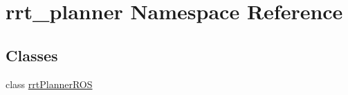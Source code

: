 \hypertarget{namespacerrt__planner}{}\section{rrt\+\_\+planner Namespace Reference}
\label{namespacerrt__planner}
\subsection*{Classes}
\begin{DoxyCompactItemize}
\item 
class \hyperlink{classrrt__planner_1_1rrtPlannerROS}{rrt\+Planner\+R\+OS}
\end{DoxyCompactItemize}

